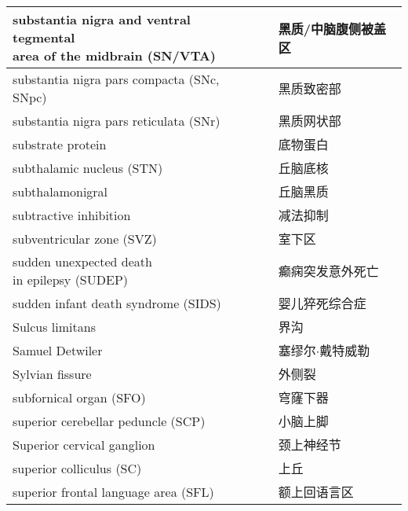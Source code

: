 \begin{longtable}{lll}
	\midrule
	\makecell[l]{substantia nigra and ventral tegmental \\area of the midbrain (SN/VTA)}   && 黑质/中脑腹侧被盖区 \\
	
	\midrule
	substantia nigra pars compacta (SNc, SNpc)  && 黑质致密部 \\
	
	\midrule
	substantia nigra pars reticulata (SNr)  && 黑质网状部 \\
	
	\midrule
	substrate protein  && 底物蛋白 \\
	
	\midrule
	subthalamic nucleus (STN)   && 丘脑底核 \\
	
	\midrule
	subthalamonigral   && 丘脑黑质 \\
	
	\midrule
	subtractive inhibition   && 减法抑制 \\
	
	\midrule
	subventricular zone (SVZ)   && 室下区 \\
	
	\midrule
	\makecell[l]{sudden unexpected death \\in epilepsy (SUDEP)}  && 癫痫突发意外死亡 \\
	
	\midrule
	sudden infant death syndrome (SIDS)  && 婴儿猝死综合症 \\
	
	\midrule
	Sulcus limitans   && 界沟 \\
	
	\midrule
	Samuel Detwiler   && 塞缪尔$\cdot$戴特威勒 \\
	
	\midrule
	Sylvian fissure   && 外侧裂 \\
	
	\midrule
	subfornical organ (SFO)  && 穹窿下器 \\
	
	\midrule
	superior cerebellar peduncle (SCP)  && 小脑上脚 \\
	
	\midrule
	Superior cervical ganglion   && 颈上神经节 \\
	
	\midrule
	superior colliculus (SC)  && 上丘 \\
	
	\midrule
	superior frontal language area (SFL) && 额上回语言区 \\
	

\end{longtable}
